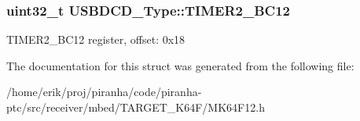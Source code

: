 \subsubsection[{\texorpdfstring{T\+I\+M\+E\+R2\+\_\+\+B\+C12}{TIMER2_BC12}}]{ uint32\+\_\+t U\+S\+B\+D\+C\+D\+\_\+\+Type\+::\+T\+I\+M\+E\+R2\+\_\+\+B\+C12}\hypertarget{structUSBDCD__Type_ada6fdec9ca1667fefe2e524287a3665c}{}\label{structUSBDCD__Type_ada6fdec9ca1667fefe2e524287a3665c}
T\+I\+M\+E\+R2\+\_\+\+B\+C12 register, offset\+: 0x18 

The documentation for this struct was generated from the following file\+:\begin{DoxyCompactItemize}
\item 
/home/erik/proj/piranha/code/piranha-\/ptc/src/receiver/mbed/\+T\+A\+R\+G\+E\+T\+\_\+\+K64\+F/M\+K64\+F12.\+h\end{DoxyCompactItemize}
